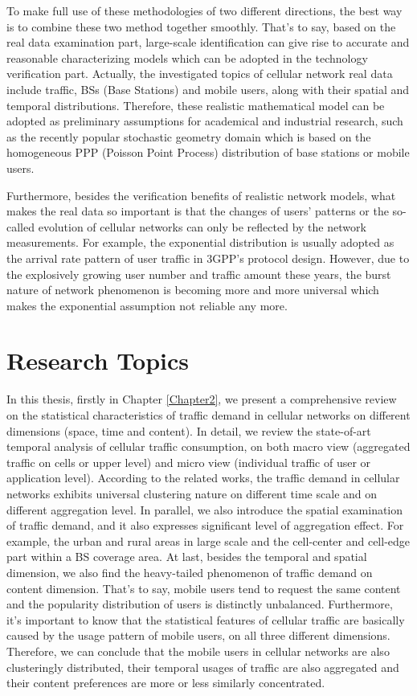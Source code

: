 To make full use of these methodologies of two different directions, the best way is to combine these two method together smoothly. That's to say, based on the real data examination part, large-scale identification can give rise to accurate and reasonable characterizing models which can be adopted in the technology verification part. Actually, the investigated topics of cellular network real data include traffic, BSs (Base Stations) and mobile users, along with their spatial and temporal distributions. Therefore, these realistic mathematical model can be adopted as preliminary assumptions for academical and industrial research, such as the recently popular stochastic geometry domain which is based on the homogeneous PPP (Poisson Point Process) distribution of base stations or mobile users.

Furthermore, besides the verification benefits of realistic network models, what makes the real data so important is that the changes of users' patterns or the so-called evolution of cellular networks can only be reflected by the network measurements. For example, the exponential distribution is usually adopted as the arrival rate pattern of user traffic in 3GPP's protocol design. However, due to the explosively growing user number and traffic amount these years, the burst nature of network phenomenon is becoming more and more universal which makes the exponential assumption not reliable any more.

\section{Research Topics}
In this thesis, firstly in Chapter \ref{Chapter2}, we present a comprehensive review on the statistical characteristics of traffic demand in cellular networks on different dimensions (space, time and content). In detail,  we review the state-of-art temporal analysis of cellular traffic consumption, on both macro view (aggregated traffic on cells or upper level) and micro view (individual traffic of user or application level). According to the related works, the traffic demand in cellular networks exhibits universal clustering nature on different time scale and on different aggregation level. In parallel, we also introduce the spatial examination of traffic demand, and it also expresses significant level of aggregation effect. For example, the urban and rural areas in large scale and the cell-center and cell-edge part within a BS coverage area. At last, besides the temporal and spatial dimension, we also find the heavy-tailed phenomenon of traffic demand on content dimension. That's to say, mobile users tend to request the same content and the popularity distribution of users is distinctly unbalanced. Furthermore, it's important to know that the statistical features of cellular traffic are basically caused by the usage pattern of mobile users, on all three different dimensions. Therefore, we can conclude that the mobile users in cellular networks are also clusteringly distributed, their temporal usages of traffic are also aggregated and their content preferences are more or less similarly concentrated.

